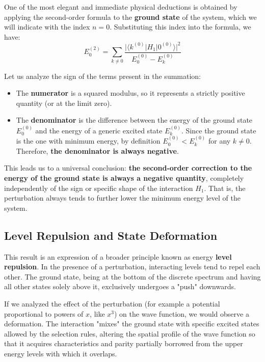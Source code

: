 One of the most elegant and immediate physical deductions is obtained by applying the second-order formula to the \textbf{ground state} of the system, which we will indicate with the index $n=0$. Substituting this index into the formula, we have:
\begin{equation}
E_0^{(2)} = \sum_{k \neq 0} \frac{\big| \langle k^{(0)} | H_1 | 0^{(0)} \rangle \big|^2}{E_0^{(0)} - E_k^{(0)}}
\end{equation}

Let us analyze the sign of the terms present in the summation:
\begin{itemize}
\item The \textbf{numerator} is a squared modulus, so it represents a strictly positive quantity (or at the limit zero).
\item The \textbf{denominator} is the difference between the energy of the ground state $E_0^{(0)}$ and the energy of a generic excited state $E_k^{(0)}$. Since the ground state is the one with minimum energy, by definition $E_0^{(0)} < E_k^{(0)}$ for any $k \neq 0$. Therefore, \textbf{the denominator is always negative}.
\end{itemize}

This leads us to a universal conclusion: \textbf{the second-order correction to the energy of the ground state is always a negative quantity}, completely independently of the sign or specific shape of the interaction $H_1$. That is, the perturbation always tends to further lower the minimum energy level of the system.

\subsection{Level Repulsion and State Deformation}
This result is an expression of a broader principle known as energy \textbf{level repulsion}. In the presence of a perturbation, interacting levels tend to repel each other. The ground state, being at the bottom of the discrete spectrum and having all other states solely above it, exclusively undergoes a "push" downwards.

If we analyzed the effect of the perturbation (for example a potential proportional to powers of $x$, like $x^3$) on the wave function, we would observe a deformation. The interaction "mixes" the ground state with specific excited states allowed by the selection rules, altering the spatial profile of the wave function so that it acquires characteristics and parity partially borrowed from the upper energy levels with which it overlaps.

